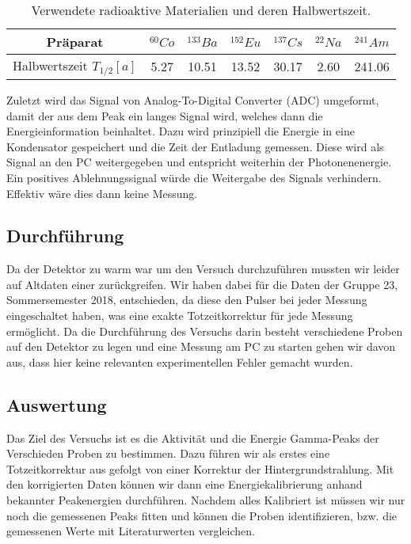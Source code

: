 \documentclass[]{article}
\begin{document}
	\begin{table}[H]
		\centering
		\begin{tabular}{c|c|c|c|c|c|c}
			Präparat & $^{60}Co$& $^{133}Ba$& $^{152}Eu$& $^{137}Cs$& $^{22}Na$ & $^{241}Am$ \\ \hline 
			Halbwertszeit $T_{1/2} [a]$ & 5.27 & 10.51 & 13.52 & 30.17 & 2.60 & 241.06  \\ 
		\end{tabular}
		\caption{Verwendete radioaktive Materialien und deren Halbwertszeit.}
		\label{tab:T 1/2}
	\end{table}
	
	Zuletzt wird das Signal von Analog-To-Digital Converter (ADC) umgeformt, damit der aus dem Peak ein langes Signal wird, welches dann die Energieinformation beinhaltet. Dazu wird prinzipiell die Energie in eine Kondensator gespeichert und die Zeit der Entladung gemessen. Diese wird als Signal an den PC weitergegeben und entspricht weiterhin der Photonenenergie. Ein positives Ablehnungssignal würde die Weitergabe des Signals verhindern. Effektiv wäre dies dann keine Messung.
	
	\subsection{Durchführung}
	Da der Detektor zu warm war um den Versuch durchzuführen mussten wir leider auf Altdaten einer zurückgreifen. Wir haben dabei für die Daten der Gruppe 23, Sommersemester 2018, entschieden, da diese den Pulser bei jeder Messung eingeschaltet haben, was eine exakte Totzeitkorrektur für jede Messung ermöglicht. Da die Durchführung des Versuchs darin besteht verschiedene Proben auf den Detektor zu legen und eine Messung am PC zu starten gehen wir davon aus, dass hier keine relevanten experimentellen Fehler gemacht wurden. 
	\subsection{Auswertung}
	Das Ziel des Versuchs ist es die Aktivität und die Energie Gamma-Peaks der Verschieden Proben zu bestimmen. Dazu führen wir als erstes eine Totzeitkorrektur aus gefolgt von einer Korrektur der Hintergrundstrahlung. Mit den korrigierten Daten können wir dann eine Energiekalibrierung anhand bekannter Peakenergien durchführen. Nachdem alles Kalibriert ist müssen wir nur noch die gemessenen Peaks fitten und können die Proben identifizieren, bzw. die gemessenen Werte mit Literaturwerten vergleichen. 
\end{document}
